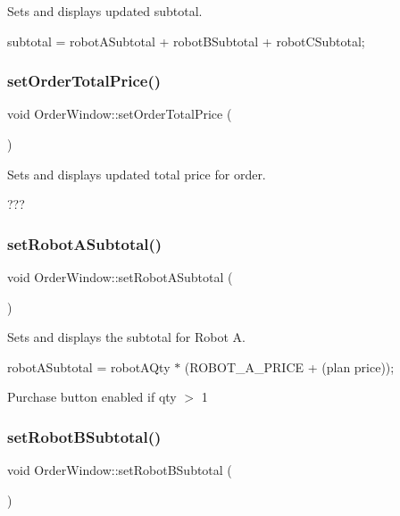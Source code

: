 Sets and displays updated subtotal. 

subtotal = robot\+A\+Subtotal + robot\+B\+Subtotal + robot\+C\+Subtotal; \mbox{\label{class_order_window_af1b6d198cf89a68c63afa28bc986786a}} 
\subsubsection{\texorpdfstring{setOrderTotalPrice()}{setOrderTotalPrice()}}
{\footnotesize\ttfamily void Order\+Window\+::set\+Order\+Total\+Price (\begin{DoxyParamCaption}{ }\end{DoxyParamCaption})}



Sets and displays updated total price for order. 

??? \mbox{\label{class_order_window_a4fec739fb9e3c2c06fdf8afa7d94a4f9}} 
\subsubsection{\texorpdfstring{setRobotASubtotal()}{setRobotASubtotal()}}
{\footnotesize\ttfamily void Order\+Window\+::set\+Robot\+A\+Subtotal (\begin{DoxyParamCaption}{ }\end{DoxyParamCaption})}



Sets and displays the subtotal for Robot A. 

robot\+A\+Subtotal = robot\+A\+Qty $\ast$ (R\+O\+B\+O\+T\+\_\+\+A\+\_\+\+P\+R\+I\+CE + (plan price));

Purchase button enabled if qty $>$ 1 \mbox{\label{class_order_window_aa575a53f391f6bc103e89f2bf2fce91e}} 
\subsubsection{\texorpdfstring{setRobotBSubtotal()}{setRobotBSubtotal()}}
{\footnotesize\ttfamily void Order\+Window\+::set\+Robot\+B\+Subtotal (\begin{DoxyParamCaption}{ }\end{DoxyParamCaption})}



